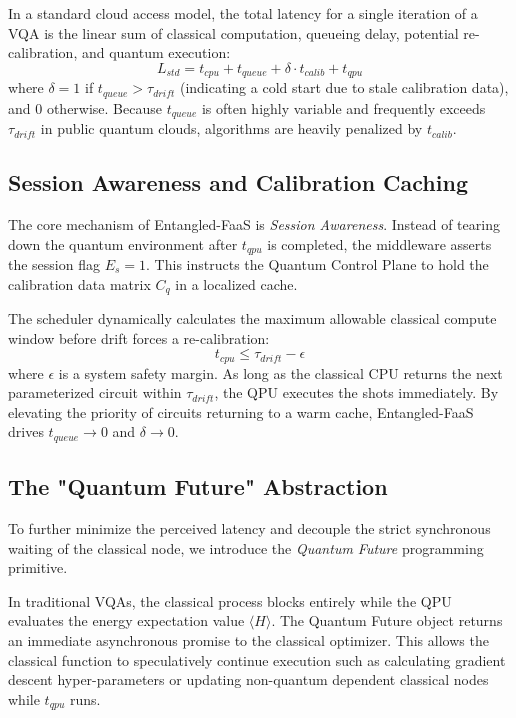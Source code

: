 \documentclass[conference]{IEEEtran}
\begin{document}
In a standard cloud access model, the total latency for a single iteration of a VQA is the linear sum of classical computation, queueing delay, potential re-calibration, and quantum execution:
\begin{equation}
    L_{std} = t_{cpu} + t_{queue} + \delta \cdot t_{calib} + t_{qpu}
\end{equation}
where $\delta = 1$ if $t_{queue} > \tau_{drift}$ (indicating a cold start due to stale calibration data), and $0$ otherwise. Because $t_{queue}$ is often highly variable and frequently exceeds $\tau_{drift}$ in public quantum clouds, algorithms are heavily penalized by $t_{calib}$.

\subsection{Session Awareness and Calibration Caching}
The core mechanism of Entangled-FaaS is \textit{Session Awareness}. Instead of tearing down the quantum environment after $t_{qpu}$ is completed, the middleware asserts the session flag $E_s = 1$. This instructs the Quantum Control Plane to hold the calibration data matrix $C_q$ in a localized cache. 

The scheduler dynamically calculates the maximum allowable classical compute window before drift forces a re-calibration:
\begin{equation}
    t_{cpu} \leq \tau_{drift} - \epsilon
\end{equation}
where $\epsilon$ is a system safety margin. As long as the classical CPU returns the next parameterized circuit within $\tau_{drift}$, the QPU executes the shots immediately. By elevating the priority of circuits returning to a warm cache, Entangled-FaaS drives $t_{queue} \to 0$ and $\delta \to 0$.

\subsection{The "Quantum Future" Abstraction}
To further minimize the perceived latency and decouple the strict synchronous waiting of the classical node, we introduce the \textit{Quantum Future} programming primitive.

In traditional VQAs, the classical process blocks entirely while the QPU evaluates the energy expectation value $\langle H \rangle$. The Quantum Future object returns an immediate asynchronous promise to the classical optimizer. This allows the classical function to speculatively continue execution such as calculating gradient descent hyper-parameters or updating non-quantum dependent classical nodes while $t_{qpu}$ runs.
\end{document}
